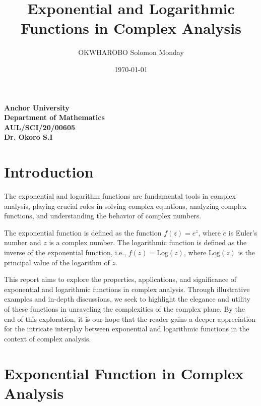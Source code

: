 \documentclass[12pt]{article}
\title{Exponential and Logarithmic Functions in Complex Analysis}
\author{OKWHAROBO Solomon Monday}
\date{\today}
\begin{document}
\maketitle

\thispagestyle{empty} %

\begin{center}
    \vspace{6cm}
    \textbf{Anchor University} \\
    \textbf{Department of Mathematics} \\
    \textbf{AUL/SCI/20/00605} \\
    \textbf{Dr. Okoro S.I}
\end{center}





\newpage

\setcounter{page}{1} %

\section{Introduction}

The exponential and logarithm functions are fundamental tools in complex analysis, playing crucial roles in solving complex equations, analyzing complex functions, and understanding the behavior of complex numbers.

The exponential function is defined as the function $f(z) = e^z$, where $e$ is Euler's number and $z$ is a complex number. The logarithmic function is defined as the inverse of the exponential function, i.e., $f(z) = \text{Log}(z)$, where $\text{Log}(z)$ is the principal value of the logarithm of $z$.

This report aims to explore the properties, applications, and significance of exponential and logarithmic functions in complex analysis. Through illustrative examples and in-depth discussions, we seek to highlight the elegance and utility of these functions in unraveling the complexities of the complex plane. By the end of this exploration, it is our hope that the reader gains a deeper appreciation for the intricate interplay between exponential and logarithmic functions in the context of complex analysis.

\section{Exponential Function in Complex Analysis}
\end{document}
